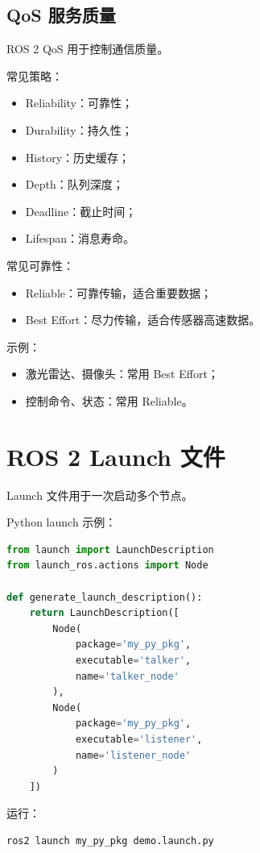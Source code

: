 \documentclass[UTF8,a4paper,12pt]{ctexart}
\begin{document}
\subsection{QoS 服务质量}

ROS 2 QoS 用于控制通信质量。

常见策略：
\begin{itemize}
    \item Reliability：可靠性；
    \item Durability：持久性；
    \item History：历史缓存；
    \item Depth：队列深度；
    \item Deadline：截止时间；
    \item Lifespan：消息寿命。
\end{itemize}

常见可靠性：
\begin{itemize}
    \item Reliable：可靠传输，适合重要数据；
    \item Best Effort：尽力传输，适合传感器高速数据。
\end{itemize}

示例：
\begin{itemize}
    \item 激光雷达、摄像头：常用 Best Effort；
    \item 控制命令、状态：常用 Reliable。
\end{itemize}

\section{ROS 2 Launch 文件}

Launch 文件用于一次启动多个节点。

Python launch 示例：

\begin{lstlisting}[language=Python]
from launch import LaunchDescription
from launch_ros.actions import Node

def generate_launch_description():
    return LaunchDescription([
        Node(
            package='my_py_pkg',
            executable='talker',
            name='talker_node'
        ),
        Node(
            package='my_py_pkg',
            executable='listener',
            name='listener_node'
        )
    ])
\end{lstlisting}

运行：

\begin{lstlisting}[language=bash]
ros2 launch my_py_pkg demo.launch.py
\end{lstlisting}
\end{document}
